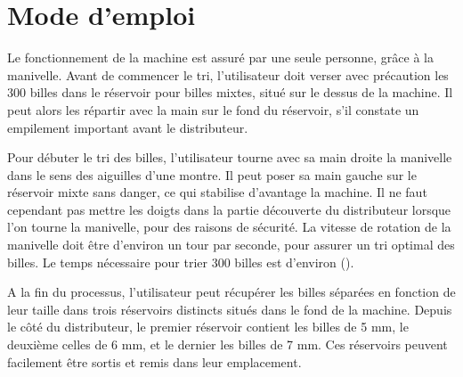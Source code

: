 \chapter{Mode d'emploi}
Le fonctionnement de la machine est assuré par une seule personne, grâce à la manivelle. Avant de commencer le tri, l'utilisateur doit verser avec précaution les 300 billes dans le réservoir pour billes mixtes, situé sur le dessus de la machine. Il peut alors les répartir avec la main sur le fond du réservoir, s'il constate un empilement important avant le distributeur.

Pour débuter le tri des billes, l'utilisateur tourne avec sa main droite la manivelle dans le sens des aiguilles d'une montre. Il peut poser sa main gauche sur le réservoir mixte sans danger, ce qui stabilise d'avantage la machine. Il ne faut cependant pas mettre les doigts dans la partie découverte du distributeur lorsque l'on tourne la manivelle, pour des raisons de sécurité. La vitesse de rotation de la manivelle doit être d'environ un tour par seconde, pour assurer un tri optimal des billes. Le temps nécessaire pour trier 300 billes est d'environ ().

A la fin du processus, l'utilisateur peut récupérer les billes séparées en fonction de leur taille dans trois réservoirs distincts situés dans le fond de la machine. Depuis le côté du distributeur, le premier réservoir contient les billes de 5 mm, le deuxième celles de 6 mm, et le dernier les billes de 7 mm. Ces réservoirs peuvent facilement être sortis et remis dans leur emplacement.